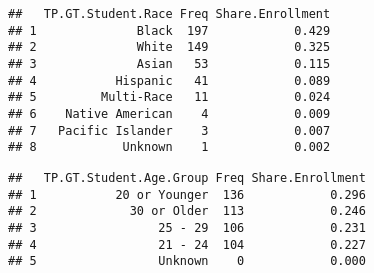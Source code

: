 \documentclass[]{article}
\newenvironment{Shaded}{\begin{snugshade}}{\end{snugshade}}
\newcommand{\KeywordTok}[1]{\textcolor[rgb]{0.13,0.29,0.53}{\textbf{#1}}}
\newcommand{\DataTypeTok}[1]{\textcolor[rgb]{0.13,0.29,0.53}{#1}}
\newcommand{\DecValTok}[1]{\textcolor[rgb]{0.00,0.00,0.81}{#1}}
\newcommand{\StringTok}[1]{\textcolor[rgb]{0.31,0.60,0.02}{#1}}
\newcommand{\OperatorTok}[1]{\textcolor[rgb]{0.81,0.36,0.00}{\textbf{#1}}}
\newcommand{\NormalTok}[1]{#1}
\begin{document}
\begin{verbatim}
##   TP.GT.Student.Race Freq Share.Enrollment
## 1              Black  197            0.429
## 2              White  149            0.325
## 3              Asian   53            0.115
## 4           Hispanic   41            0.089
## 5         Multi-Race   11            0.024
## 6    Native American    4            0.009
## 7   Pacific Islander    3            0.007
## 8            Unknown    1            0.002
\end{verbatim}

\begin{Shaded}
\end{Shaded}

\begin{verbatim}
##   TP.GT.Student.Age.Group Freq Share.Enrollment
## 1           20 or Younger  136            0.296
## 2             30 or Older  113            0.246
## 3                 25 - 29  106            0.231
## 4                 21 - 24  104            0.227
## 5                 Unknown    0            0.000
\end{verbatim}
\end{document}
